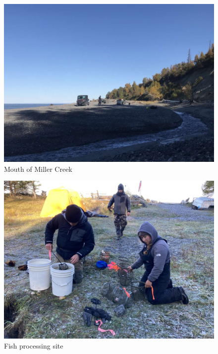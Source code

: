 \documentclass[
]{book}
\begin{document}
\begin{figure}
\centering
\includegraphics{images/fish_rescue/IMG-0063.jpg}
\caption{\label{fig:unnamed-chunk-19}Mouth of Miller Creek}
\end{figure}

\begin{figure}
\centering
\includegraphics{images/fish_rescue/IMG-6271.jpg}
\caption{\label{fig:unnamed-chunk-20}Fish processing site}
\end{figure}
\end{document}

